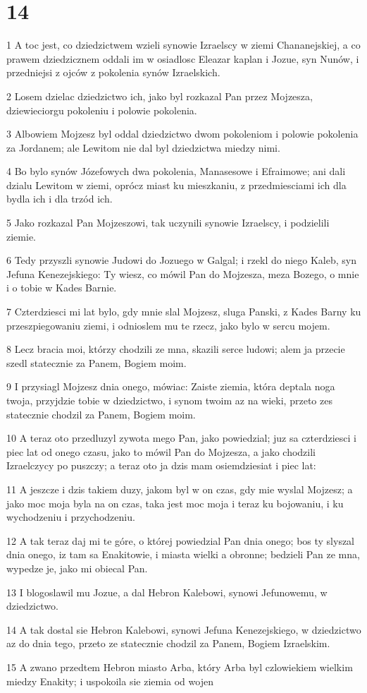 \chapter{14}

\par 1 A toc jest, co dziedzictwem wzieli synowie Izraelscy w ziemi Chananejskiej, a co prawem dziedzicznem oddali im w osiadlosc Eleazar kaplan i Jozue, syn Nunów, i przedniejsi z ojców z pokolenia synów Izraelskich.
\par 2 Losem dzielac dziedzictwo ich, jako byl rozkazal Pan przez Mojzesza, dziewieciorgu pokoleniu i polowie pokolenia.
\par 3 Albowiem Mojzesz byl oddal dziedzictwo dwom pokoleniom i polowie pokolenia za Jordanem; ale Lewitom nie dal byl dziedzictwa miedzy nimi.
\par 4 Bo bylo synów Józefowych dwa pokolenia, Manasesowe i Efraimowe; ani dali dzialu Lewitom w ziemi, oprócz miast ku mieszkaniu, z przedmiesciami ich dla bydla ich i dla trzód ich.
\par 5 Jako rozkazal Pan Mojzeszowi, tak uczynili synowie Izraelscy, i podzielili ziemie.
\par 6 Tedy przyszli synowie Judowi do Jozuego w Galgal; i rzekl do niego Kaleb, syn Jefuna Kenezejskiego: Ty wiesz, co mówil Pan do Mojzesza, meza Bozego, o mnie i o tobie w Kades Barnie.
\par 7 Czterdziesci mi lat bylo, gdy mnie slal Mojzesz, sluga Panski, z Kades Barny ku przeszpiegowaniu ziemi, i odnioslem mu te rzecz, jako bylo w sercu mojem.
\par 8 Lecz bracia moi, którzy chodzili ze mna, skazili serce ludowi; alem ja przecie szedl statecznie za Panem, Bogiem moim.
\par 9 I przysiagl Mojzesz dnia onego, mówiac: Zaiste ziemia, która deptala noga twoja, przyjdzie tobie w dziedzictwo, i synom twoim az na wieki, przeto zes statecznie chodzil za Panem, Bogiem moim.
\par 10 A teraz oto przedluzyl zywota mego Pan, jako powiedzial; juz sa czterdziesci i piec lat od onego czasu, jako to mówil Pan do Mojzesza, a jako chodzili Izraelczycy po puszczy; a teraz oto ja dzis mam osiemdziesiat i piec lat:
\par 11 A jeszcze i dzis takiem duzy, jakom byl w on czas, gdy mie wyslal Mojzesz; a jako moc moja byla na on czas, taka jest moc moja i teraz ku bojowaniu, i ku wychodzeniu i przychodzeniu.
\par 12 A tak teraz daj mi te góre, o której powiedzial Pan dnia onego; bos ty slyszal dnia onego, iz tam sa Enakitowie, i miasta wielki a obronne; bedzieli Pan ze mna, wypedze je, jako mi obiecal Pan.
\par 13 I blogoslawil mu Jozue, a dal Hebron Kalebowi, synowi Jefunowemu, w dziedzictwo.
\par 14 A tak dostal sie Hebron Kalebowi, synowi Jefuna Kenezejskiego, w dziedzictwo az do dnia tego, przeto ze statecznie chodzil za Panem, Bogiem Izraelskim.
\par 15 A zwano przedtem Hebron miasto Arba, który Arba byl czlowiekiem wielkim miedzy Enakity; i uspokoila sie ziemia od wojen

